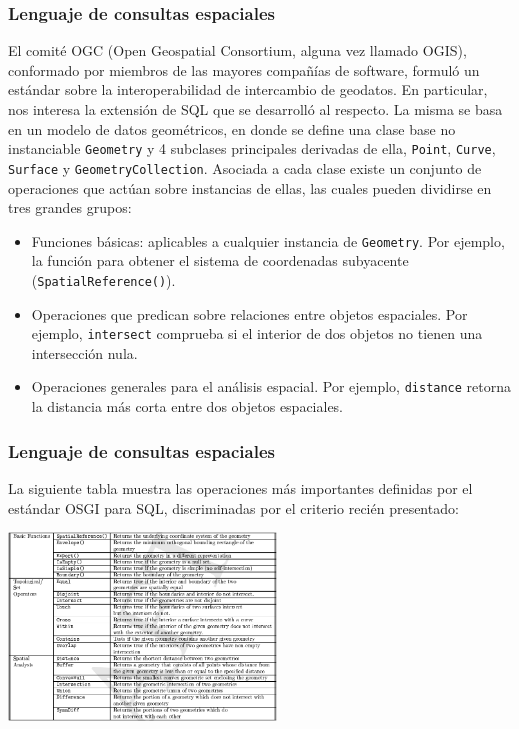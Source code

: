 \begin{frame}
		\frametitle{Lenguaje de consultas espaciales}
		El comité OGC (Open Geospatial Consortium, alguna vez llamado OGIS), conformado por miembros de las mayores compañías de software, formuló un estándar sobre la interoperabilidad de intercambio de geodatos. En particular, nos interesa la extensión de SQL que se desarrolló al respecto. \pause
		La misma se basa en un modelo de datos geométricos, en donde se define una clase base no instanciable \texttt{Geometry} y 4 subclases principales derivadas de ella, \texttt{Point}, \texttt{Curve}, \texttt{Surface} y \texttt{GeometryCollection}.
		Asociada a cada clase existe un conjunto de operaciones que actúan sobre instancias de ellas, las cuales pueden dividirse en tres grandes grupos: \\ \pause
		\begin{itemize}
			\item Funciones básicas: aplicables a cualquier instancia de \texttt{Geometry}. Por ejemplo, la función para obtener el sistema de coordenadas subyacente (\texttt{SpatialReference()}).
			\item Operaciones que predican sobre relaciones entre objetos espaciales. Por ejemplo, \texttt{intersect} comprueba si el interior de dos objetos no tienen una intersección nula.
			\item Operaciones generales para el análisis espacial. Por ejemplo, \texttt{distance} retorna la distancia más corta entre dos objetos espaciales.
		\end{itemize}
\end{frame}

\begin{frame}
		\frametitle{Lenguaje de consultas espaciales}
		La siguiente tabla muestra las operaciones más importantes definidas por el estándar OSGI para SQL, discriminadas por el criterio recién presentado: \\
	\begin{center}
	\includegraphics[height=5cm]{tablaOGIS.png}
	\end{center}
\end{frame}

